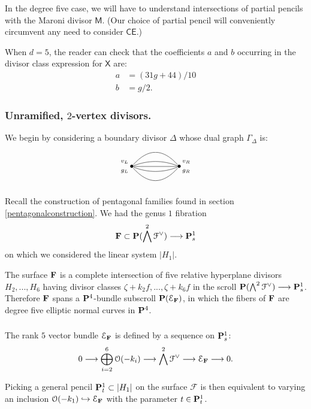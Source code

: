 \documentclass[reqno, 10 pt]{article}
\theoremstyle{definition}
\theoremstyle{remark}
\numberwithin{equation}{section}
\numberwithin{thm}{section}
\numberwithin{prop}{section}
\numberwithin{lem}{section}
\numberwithin{cor}{section}
\numberwithin{conj}{section}
\numberwithin{defn}{section}
\newcommand{\F}{{\mathbf F}}
\renewcommand{\to}{\longrightarrow}
\newcommand{\sfX}{{\mathsf X}}
\newcommand{\sfCE}{{\mathsf {CE}}}
\newcommand{\sfM}{{\mathsf M}}
\newcommand{\cE}{{\mathcal E}}
\newcommand{\cF}{{\mathcal F}}
\newcommand{\cO}{{\mathcal O}}
\renewcommand{\P}{{\bf P}}
\renewcommand{\F}{{\bf F}}
\begin{document}
In the degree five case, we will have to understand intersections of partial pencils with the Maroni divisor $\sfM$. (Our choice of partial pencil will conveniently circumvent any need to consider $\sfCE$.)

When $d=5$, the reader can check that the coefficients $a$ and $b$ occurring in the divisor class expression for $\sfX$ are: 
\begin{align*}
a &= (31g+44)/10\\
b &= g/2.
\end{align*}

\subsubsection{Unramified, $2$-vertex divisors.}\label{pentagonalunramified} We begin by considering a boundary divisor $\Delta$ whose dual graph $\Gamma_{\Delta}$ is: 

\[  \xygraph{
!{<0cm,0cm>;<1cm,0cm>:<0cm,1cm>::}
!{(0,0) }*{\bullet}="l"!{(-.3,.2)}{\scriptstyle v_L}!{(-.3,-.2)}{\scriptstyle g_L}
!{(2,0) }*{\bullet}="r"!{(2.3,.2)}{\scriptstyle v_R}!{(2.3,-.2)}{\scriptstyle g_R}
 "l"-@/^.6cm/"r"  
"l"-@/^/"r" 
"l"-"r" 
"l"-@/_/"r"
"l"-@/_.6cm/"r" 
}  \]



\subsubsection{}
Recall the construction of pentagonal families found in section \ref{pentagonalconstruction}.  We had the genus $1$ fibration $$\F \subset \P(\bigwedge^{2} \dual{\cF}) \to \P^{1}_{s}$$ on which we considered the linear system $|H_{1}|$. 

The surface $\F$ is a complete intersection of five relative hyperplane divisors $H_{2}, ... ,H_{6}$ having divisor classes $\zeta + k_{2}f, ... , \zeta + k_{6}f$ in the scroll $\P(\bigwedge^{2} \dual{\cF}) \to \P^{1}_{s}$.  Therefore $\F$ spans a $\P^{4}$-bundle subscroll $\P(\cE_{\F})$, in which the fibers of $\F$ are degree five elliptic normal curves in $\P^{4}$. 

\subsubsection{}
The rank $5$ vector bundle $\cE_{\F}$ is defined by a sequence on $\P^{1}_{s}$: 
$$0 \to \bigoplus_{i = 2}^{6}\cO(-k_{i}) \to \bigwedge^{2}\dual{\cF} \to \cE_{\F} \to 0.$$

Picking a general pencil $\P^{1}_{t} \subset |H_{1}|$ on the surface $\cF$ is then equivalent to varying an inclusion $\cO(-k_{1}) \hookrightarrow \cE_{\F}$ with the parameter $t \in \P^{1}_{t}$. 
\end{document}
